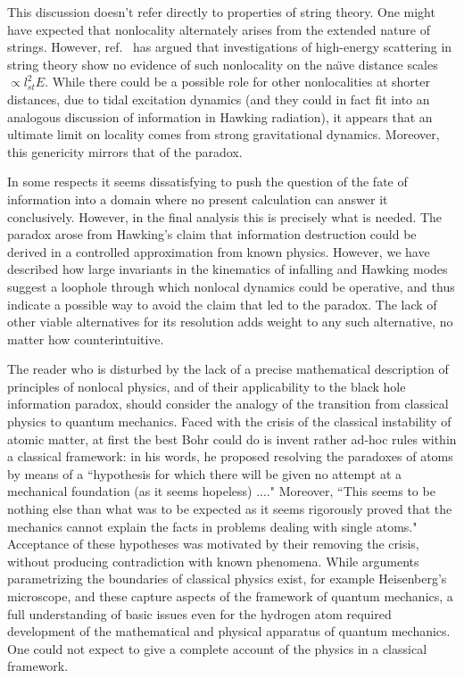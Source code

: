 This discussion doesn't refer directly to properties of string theory.  One might have expected that nonlocality alternately arises from the extended nature of strings.  However, ref.~ has argued that investigations of high-energy scattering in string theory show no evidence of such nonlocality on the na\"\i ve distance scales $\propto l_{st}^2 E$.  While there could be a possible role for other nonlocalities at shorter distances, due to tidal excitation dynamics (and they could in fact fit into an analogous discussion of information in Hawking radiation), it appears that an ultimate limit on locality comes from strong gravitational dynamics.  Moreover, this genericity mirrors that of the paradox.

In some respects it seems dissatisfying to push the question of the fate of information into a domain where no present calculation can answer it conclusively.  However, in the final analysis this is precisely what is needed.  The paradox arose from Hawking's claim that information destruction could be derived in a controlled approximation from known physics.  However, we have described how
large invariants in the kinematics of infalling and Hawking modes suggest a loophole through which nonlocal dynamics could be operative, and thus indicate a possible way to avoid the claim that led to the paradox.
The lack of other viable alternatives for its resolution adds weight to any such alternative, no matter how counterintuitive.

The reader who is disturbed by the lack of a precise mathematical description of principles of nonlocal physics, and of their applicability to the black hole information paradox, should consider the analogy of the transition from classical physics to quantum mechanics.  Faced with the crisis of the classical instability of atomic matter, at first the best Bohr could do is invent rather ad-hoc rules within a classical framework: in his words, he proposed resolving the paradoxes of atoms by means of a ``hypothesis for which there will be given no attempt at a mechanical foundation (as it seems hopeless) ...\Bohr."  Moreover, ``This seems to be nothing else than what was to be expected as it seems rigorously proved that the mechanics cannot explain the facts in problems dealing with single atoms\Bohr."
Acceptance of these hypotheses was motivated by their removing the crisis, without producing contradiction with known phenomena.  While arguments parametrizing the boundaries of classical physics exist, for example Heisenberg's microscope, and these capture aspects of the framework of quantum mechanics, a full understanding of basic issues even for the hydrogen atom required development of the mathematical and physical apparatus of quantum mechanics.  One could not expect to give a complete account of the physics in a classical
framework.

